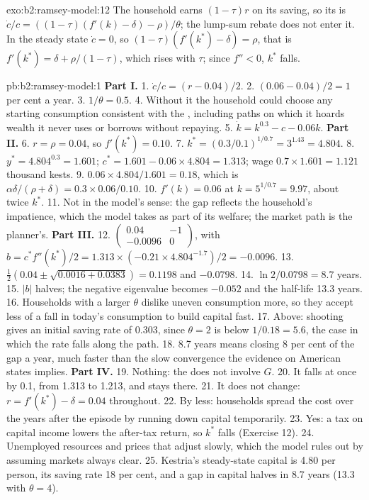 \begin{solution}{exo:b2:ramsey-model:12}
The household earns $(1 - \tau)r$ on its saving, so its  is $\dot c/c = ((1 - \tau)(f'(k) - \delta) - \rho)/\theta$; the lump-sum rebate does not enter it. In the steady state $\dot c = 0$, so $(1 - \tau)(f'(k^*) - \delta) = \rho$, that
is $f'(k^*) = \delta + \rho/(1 - \tau)$, which rises with $\tau$; since $f'' < 0$, $k^*$ falls.
\end{solution}

\begin{solution}{pb:b2:ramsey-model:1}
\textbf{Part I.}
1. $\dot c/c = (r - 0.04)/2$.
2. $(0.06 - 0.04)/2 = 1$ per cent a year.
3. $1/\theta = 0.5$.
4. Without it the household could choose any starting consumption consistent with the , including paths on
which it hoards wealth it never uses or borrows without repaying.
5. $\dot k = k^{0.3} - c - 0.06k$.
\textbf{Part II.}
6. $r = \rho = 0.04$, so $f'(k^*) = 0.10$.
7. $k^* = (0.3/0.1)^{1/0.7} = 3^{1.43} = 4.804$.
8. $y^* = 4.804^{0.3} = 1.601$; $c^* = 1.601 - 0.06 \times 4.804 = 1.313$; wage $0.7 \times 1.601 = 1.121$ thousand kests.
9. $0.06 \times 4.804/1.601 = 0.18$, which is $\alpha\delta/(\rho + \delta) = 0.3 \times 0.06/0.10$.
10. $f'(k) = 0.06$ at $k = 5^{1/0.7} = 9.97$, about twice $k^*$.
11. Not in the model's sense: the gap reflects the household's impatience, which the model takes as part of its welfare;
the market path is the planner's.
\textbf{Part III.}
12. $\begin{pmatrix} 0.04 & -1 \\ -0.0096 & 0 \end{pmatrix}$, with $b = c^*f''(k^*)/2 = 1.313 \times (-0.21 \times 4.804^{-1.7})/2 = -0.0096$.
13. $\tfrac12(0.04 \pm \sqrt{0.0016 + 0.0383}) = 0.1198$ and $-0.0798$.
14. $\ln 2/0.0798 = 8.7$ years.
15. $|b|$ halves; the negative eigenvalue becomes $-0.052$ and the half-life 13.3 years.
16. Households with a larger $\theta$ dislike uneven consumption more, so they accept less of a fall in today's consumption to
build capital fast.
17. Above: shooting gives an initial saving rate of 0.303, since $\theta = 2$ is below $1/0.18 = 5.6$, the case in which the rate falls along the path.
18. 8.7 years means closing 8 per cent of the gap a year, much faster than the slow convergence the evidence on American states
implies.
\textbf{Part IV.}
19. Nothing: the  does not involve $G$.
20. It falls at once by 0.1, from 1.313 to 1.213, and stays there.
21. It does not change: $r = f'(k^*) - \delta = 0.04$ throughout.
22. By less: households spread the cost over the years after the episode by running down capital temporarily.
23. Yes: a tax on capital income lowers the after-tax return, so $k^*$ falls (Exercise 12).
24. Unemployed resources and prices that adjust slowly, which the model rules out by assuming markets always clear.
25. Kestria's steady-state capital is 4.80 per person, its saving rate 18 per cent, and a gap in capital halves in 8.7 years (13.3 with $\theta = 4$).
\end{solution}
